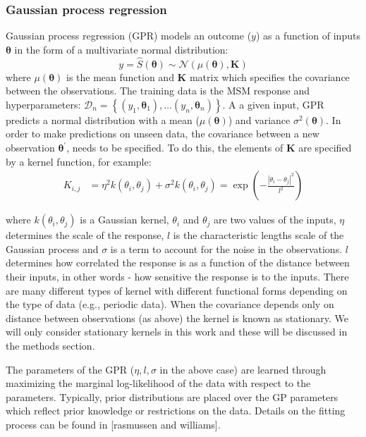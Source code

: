 \documentclass[journal=jacsat,manuscript=article]{achemso}
\begin{document}
\subsubsection{Gaussian process regression}

Gaussian process regression (GPR) models an outcome ($y$) as a function of inputs $\bm{\theta}$ in the form of a multivariate normal distribution: 
\begin{equation}
   y = \hat{S}(\bm{\theta}) \sim \mathcal{N}\left(\mu(\bm{\theta}), \mathbf{K}\right )
\end{equation}
where $\mu(\bm{\theta})$ is the mean function and $\mathbf{K}$ matrix which specifies the covariance between the observations. The training data is the MSM response and hyperparameters: $\mathcal{D}_{n}=\left\{(y_1, \bm{\theta}_1),  \ldots (y_n, \bm{\theta}_n) \right \}$. A a given input, GPR predicts a normal distribution with a mean ($\mu(\bm{\theta})$) and variance $\sigma^{2}(\bm{\theta})$. In order to make predictions on unseen data, the covariance between a new observation $\bm{\theta}^{\prime}$, needs to be specified. To do this, the elements of $\mathbf{K}$ are specified by a kernel function, for example: 
\begin{align}
    K_{i,j} & = \eta^2  k(\theta_i, \theta_j) + \sigma^2
    k(\theta_i, \theta_j) =  \exp\left(-\frac{\left|\theta_i-\theta_j\right|^2}{l^2}\right)
\end{align}

where $k(\theta_i, \theta_j)$ is a Gaussian kernel,  $\theta_i$ and $\theta_j$ are two values of the inputs, $\eta$ determines the scale of the response, $l$ is the characteristic lengths scale of the Gaussian process and $\sigma$ is a term to account for the noise in the observations. $l$ determines how correlated the response is as a function of the distance between their inputs, in other words - how sensitive the response is to the inputs. There are many different types of kernel with different functional forms depending on the type of data (e.g., periodic data). When the covariance depends only on distance between observations (as above) the kernel is known as stationary.  We will only consider stationary kernels in this work and these will be discussed in the methods section. 

The parameters of the GPR ($\eta, l, \sigma$ in the above case) are learned through maximizing the marginal log-likelihood of the data with respect to the parameters. Typically, prior distributions are placed over the GP parameters which reflect prior knowledge or restrictions on the data. Details on the fitting process can be found in [rasmussen and williams]. 
\end{document}
